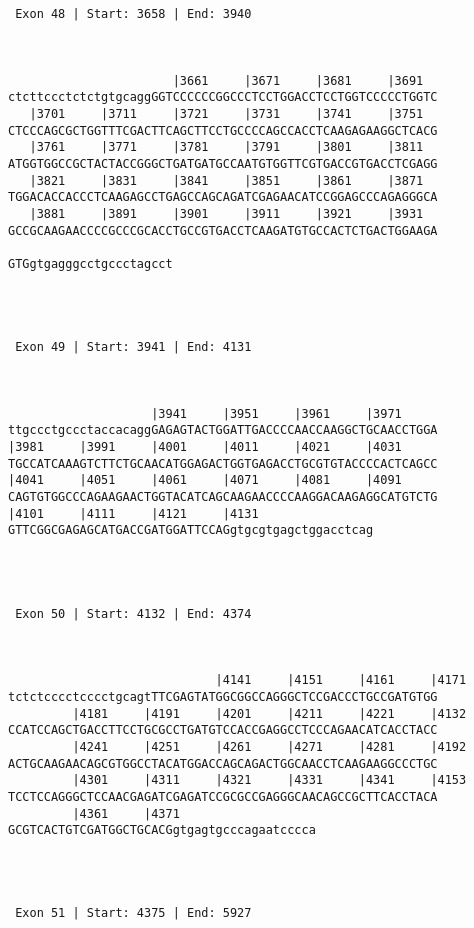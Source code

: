 \documentclass{article}
\begin{document}
\begin{Verbatim}
 Exon 48 | Start: 3658 | End: 3940 



                       |3661     |3671     |3681     |3691  
ctcttccctctctgtgcaggGGTCCCCCCGGCCCTCCTGGACCTCCTGGTCCCCCTGGTC
   |3701     |3711     |3721     |3731     |3741     |3751  
CTCCCAGCGCTGGTTTCGACTTCAGCTTCCTGCCCCAGCCACCTCAAGAGAAGGCTCACG
   |3761     |3771     |3781     |3791     |3801     |3811  
ATGGTGGCCGCTACTACCGGGCTGATGATGCCAATGTGGTTCGTGACCGTGACCTCGAGG
   |3821     |3831     |3841     |3851     |3861     |3871  
TGGACACCACCCTCAAGAGCCTGAGCCAGCAGATCGAGAACATCCGGAGCCCAGAGGGCA
   |3881     |3891     |3901     |3911     |3921     |3931  
GCCGCAAGAACCCCGCCCGCACCTGCCGTGACCTCAAGATGTGCCACTCTGACTGGAAGA
                       
GTGgtgagggcctgccctagcct




 Exon 49 | Start: 3941 | End: 4131 



                    |3941     |3951     |3961     |3971     
ttgccctgccctaccacaggGAGAGTACTGGATTGACCCCAACCAAGGCTGCAACCTGGA
|3981     |3991     |4001     |4011     |4021     |4031     
TGCCATCAAAGTCTTCTGCAACATGGAGACTGGTGAGACCTGCGTGTACCCCACTCAGCC
|4041     |4051     |4061     |4071     |4081     |4091     
CAGTGTGGCCCAGAAGAACTGGTACATCAGCAAGAACCCCAAGGACAAGAGGCATGTCTG
|4101     |4111     |4121     |4131                
GTTCGGCGAGAGCATGACCGATGGATTCCAGgtgcgtgagctggacctcag




 Exon 50 | Start: 4132 | End: 4374 



                             |4141     |4151     |4161     |4171
tctctcccctcccctgcagtTTCGAGTATGGCGGCCAGGGCTCCGACCCTGCCGATGTGG
         |4181     |4191     |4201     |4211     |4221     |4132
CCATCCAGCTGACCTTCCTGCGCCTGATGTCCACCGAGGCCTCCCAGAACATCACCTACC
         |4241     |4251     |4261     |4271     |4281     |4192
ACTGCAAGAACAGCGTGGCCTACATGGACCAGCAGACTGGCAACCTCAAGAAGGCCCTGC
         |4301     |4311     |4321     |4331     |4341     |4153
TCCTCCAGGGCTCCAACGAGATCGAGATCCGCGCCGAGGGCAACAGCCGCTTCACCTACA
         |4361     |4371                   
GCGTCACTGTCGATGGCTGCACGgtgagtgcccagaatcccca




 Exon 51 | Start: 4375 | End: 5927 




\end{Verbatim}
\end{document}
